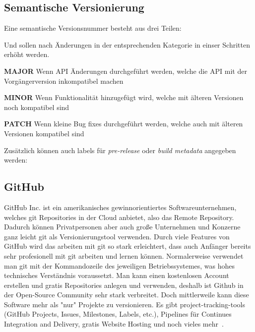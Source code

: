 \cite{git-workflow}

\subsection{Semantische Versionierung}
Eine semantische Versionsnummer besteht aus drei Teilen:

\begin{center}
\end{center}

Und sollen nach Änderungen in der entsprechenden Kategorie in einser Schritten erhöht werden.

\textbf{MAJOR}
Wenn API Änderungen durchgeführt werden, welche die API mit der Vorgängerversion inkompatibel machen
\linebreak

\textbf{MINOR}
Wenn Funktionalität hinzugefügt wird, welche mit älteren Versionen noch kompatibel sind
\linebreak

\textbf{PATCH}
Wenn kleine Bug fixes durchgeführt werden, welche auch mit älteren Versionen kompatibel sind
\linebreak

Zusätzlich können auch labels für \emph{pre-release} oder \emph{build metadata} angegeben werden:

\begin{center}
\end{center}

\cite{semantische-versionierung}

\subsection{GitHub}\label{subsec:github}
GitHub Inc. ist ein amerikanisches gewinnorientiertes Softwareunternehmen, welches git Repositories in der Cloud anbietet,
also das Remote Repository.
Dadurch können Privatpersonen aber auch große Unternehmen und Konzerne ganz leicht git als Versionierungstool verwenden.
Durch viele Features von GitHub wird das arbeiten mit git so stark erleichtert, dass auch Anfänger bereits sehr profesionell
mit git arbeiten und lernen können.
Normalerweise verwendet man git mit der Kommandozeile des jeweiligen Betriebssystemes, was hohes technisches Verständnis voraussetzt.
Man kann einen kostenlosen Account erstellen und gratis Repositories anlegen und verwenden,
deshalb ist Github in der Open-Source Community sehr stark verbreitet.
Doch mittlerweile kann diese Software mehr als "nur" Projekte zu versionieren.
Es gibt project-tracking-tools (GitHub Projects, Issues, Milestones, Labels, etc.), Pipelines für Continues Integration and Delivery,
gratis Website Hosting und noch vieles mehr~\cite{github-features}.

